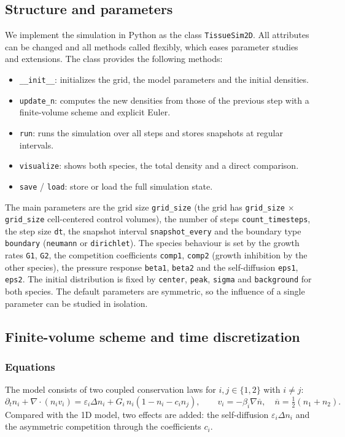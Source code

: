 \documentclass[11pt]{article}
\newcommand{\nbar}{\overline{n}}
\begin{document}
\subsection{Structure and parameters}
We implement the simulation in Python as the class \texttt{TissueSim2D}. All
attributes can be changed and all methods called flexibly, which eases parameter
studies and extensions. The class provides the following methods:
\begin{itemize}
    \item \texttt{\_\_init\_\_}: initializes the grid, the model parameters and the
    initial densities.
    \item \texttt{update\_n}: computes the new densities from those of the previous
    step with a finite-volume scheme and explicit Euler.
    \item \texttt{run}: runs the simulation over all steps and stores snapshots at
    regular intervals.
    \item \texttt{visualize}: shows both species, the total density and a direct
    comparison.
    \item \texttt{save} / \texttt{load}: store or load the full simulation state.
\end{itemize}

The main parameters are the grid size \texttt{grid\_size} (the grid has
\texttt{grid\_size} $\times$ \texttt{grid\_size} cell-centered control volumes),
the number of steps \texttt{count\_timesteps}, the step size \texttt{dt}, the
snapshot interval \texttt{snapshot\_every} and the boundary type
\texttt{boundary} (\texttt{neumann} or \texttt{dirichlet}). The species behaviour
is set by the growth rates \texttt{G1}, \texttt{G2}, the competition coefficients
\texttt{comp1}, \texttt{comp2} (growth inhibition by the other species), the
pressure response \texttt{beta1}, \texttt{beta2} and the self-diffusion
\texttt{eps1}, \texttt{eps2}. The initial distribution is fixed by \texttt{center},
\texttt{peak}, \texttt{sigma} and \texttt{background} for both species. The default
parameters are symmetric, so the influence of a single parameter can be studied in
isolation.

\subsection{Finite-volume scheme and time discretization}
\subsubsection{Equations}
The model consists of two coupled conservation laws for $i, j \in \{1, 2\}$ with
$i \neq j$:
\begin{equation}
    \partial_t n_i + \nabla \cdot (n_i v_i) = \varepsilon_i \Delta n_i
    + G_i\, n_i (1 - n_i - c_i n_j), \qquad
    v_i = -\beta_i \nabla \nbar, \quad \nbar = \tfrac{1}{2}(n_1 + n_2).
\end{equation}
Compared with the 1D model, two effects are added: the self-diffusion
$\varepsilon_i \Delta n_i$ and the asymmetric competition through the coefficients
$c_i$.
\end{document}
